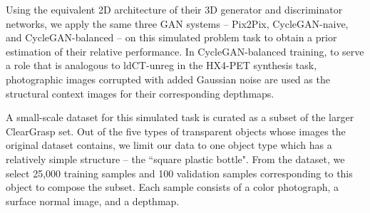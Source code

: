 Using the equivalent 2D architecture of their 3D generator and discriminator networks, we apply the same three GAN systems -- Pix2Pix, CycleGAN-naive, and CycleGAN-balanced -- on this simulated problem task to obtain a prior estimation of their relative performance. In CycleGAN-balanced training, to serve a role that is analogous to ldCT-unreg in the HX4-PET synthesis task, photographic images corrupted with added Gaussian noise are used as the structural context images for their corresponding depthmaps.

A small-scale dataset for this simulated task is curated as a subset of the larger ClearGrasp set. Out of the five types of transparent objects whose images the original dataset contains, we limit our data to one object type which has a relatively simple structure -- the ``square plastic bottle". From the dataset, we select 25,000 training samples and 100 validation samples corresponding to this object to compose the subset. Each sample consists of a color photograph, a surface normal image, and a depthmap.